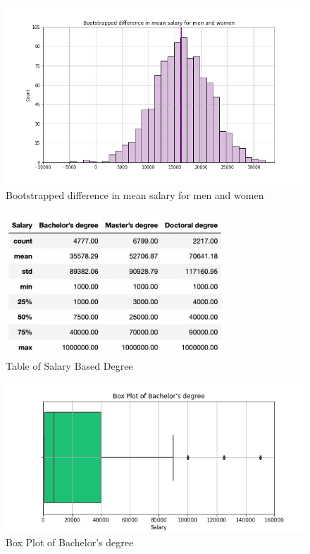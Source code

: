 \documentclass[10pt,onecolumn,letterpaper]{article}
\begin{document}
\begin{figure}[htbp]
  \centering
  \includegraphics[width=1\textwidth]{f16.png}
  \caption{Bootstrapped difference in mean salary for men and women}
\end{figure}

\begin{figure}[htbp]
  \centering
  \includegraphics[width=0.75\textwidth]{f17.png}
  \caption{Table of Salary Based Degree}
\end{figure}

\begin{figure}[htbp]
  \centering
  \includegraphics[width=.75\textwidth]{f18.png}
  \caption{Box Plot of Bachelor’s degree}
\end{figure}
\end{document}
